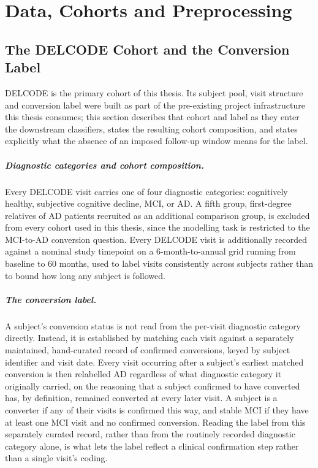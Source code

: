 
\chapter{Data, Cohorts and Preprocessing}\label{ch:data}

\section{The DELCODE Cohort and the Conversion Label}\label{sec:delcode}

\ac{DELCODE} is the primary cohort of this thesis. Its subject pool, visit structure and
conversion label were built as part of the pre-existing project infrastructure this thesis
consumes; this section describes that cohort and label as they enter the downstream
classifiers, states the resulting cohort composition, and states explicitly what the
absence of an imposed follow-up window means for the label.

\paragraph{Diagnostic categories and cohort composition.} Every \ac{DELCODE} visit carries
one of four diagnostic categories: cognitively healthy, subjective cognitive decline,
\ac{MCI}, or \ac{AD}. A fifth group, first-degree relatives of \ac{AD} patients recruited
as an additional comparison group, is excluded from every cohort used in this thesis, since
the modelling task is restricted to the \ac{MCI}-to-\ac{AD} conversion question. Every
\ac{DELCODE} visit is additionally recorded against a nominal study timepoint on a
6-month-to-annual grid running from baseline to 60 months, used to label visits
consistently across subjects rather than to bound how long any subject is followed.

\paragraph{The conversion label.} A subject's conversion status is not read from the
per-visit diagnostic category directly. Instead, it is established by matching each visit
against a separately maintained, hand-curated record of confirmed conversions, keyed by
subject identifier and visit date. Every visit occurring after a subject's earliest
matched conversion is then relabelled \ac{AD} regardless of what diagnostic category it
originally carried, on the reasoning that a subject confirmed to have converted has, by
definition, remained converted at every later visit. A subject is a converter if any of
their visits is confirmed this way, and stable \ac{MCI} if they have at least one \ac{MCI}
visit and no confirmed conversion. Reading the label from this separately curated record,
rather than from the routinely recorded diagnostic category alone, is what lets the label
reflect a clinical confirmation step rather than a single visit's coding.

